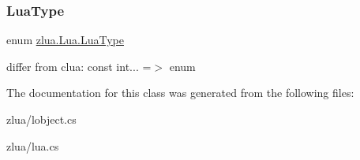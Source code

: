 \subsubsection{\texorpdfstring{Lua\+Type}{LuaType}}
{\footnotesize\ttfamily enum \mbox{\hyperlink{classzlua_1_1_lua_a3bea46ecc2aabf23ac160bd7e7172e70}{zlua.\+Lua.\+Lua\+Type}}\hspace{0.3cm}{\ttfamily [strong]}}



differ from clua\+: const int... =$>$ enum 



The documentation for this class was generated from the following files\+:\begin{DoxyCompactItemize}
\item 
zlua/lobject.\+cs\item 
zlua/lua.\+cs\end{DoxyCompactItemize}
